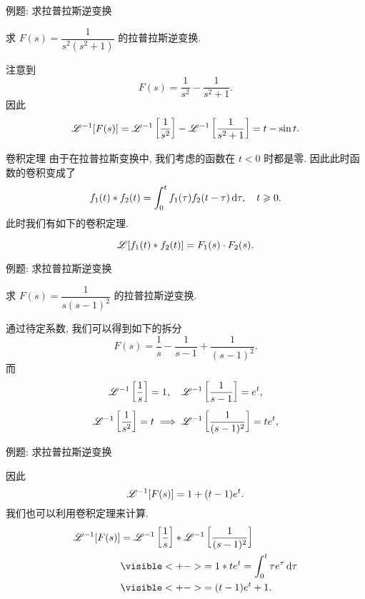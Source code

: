 \begin{frame}{例题: 求拉普拉斯逆变换}
\begin{example}
求 $F(s)=\dfrac1{s^2(s^2+1)}$ 的拉普拉斯逆变换.
\end{example}
\begin{solution}
注意到
\[F(s)=\frac1{s^2}-\frac1{s^2+1}.\]
\onslide<+->
因此
\[\mathscr{L}^{-1}[F(s)]=\mathscr{L}^{-1}\left[\frac1{s^2}\right]
-\mathscr{L}^{-1}\left[\frac1{s^2+1}\right]
=t-\sin t.\]
\end{solution}
\end{frame}


\begin{frame}{卷积定理}
\onslide<+->
由于在拉普拉斯变换中, 我们考虑的函数在 $t<0$ 时都是零.
\onslide<+->
因此此时函数的卷积变成了
\[f_1(t)\ast f_2(t)=\int_0^t f_1(\tau)f_2(t-\tau)\,\mathrm{d} \tau,\quad t\geqslant 0.\]
\onslide<+->
此时我们有如下的卷积定理.
\begin{theorem}[卷积定理]
\[\mathscr{L}[f_1(t)\ast f_2(t)]=F_1(s)\cdot F_2(s).\]
\end{theorem}
\end{frame}


\begin{frame}{例题: 求拉普拉斯逆变换}
\beqskip{6pt}
\begin{example}
求 $F(s)=\dfrac1{s(s-1)^2}$ 的拉普拉斯逆变换.
\end{example}
\begin{solution}
通过待定系数, 我们可以得到如下的拆分
\[F(s)=\frac1s-\frac1{s-1}+\frac1{(s-1)^2}.\]
\onslide<+->
而
\[\mathscr{L}^{-1}\left[\frac1s\right]=1,\quad \mathscr{L}^{-1}\left[\frac1{s-1}\right]=e^t,\]
\onslide<+->
\[\mathscr{L}^{-1}\left[\frac1{s^2}\right]=t\implies\mathscr{L}^{-1}\left[\frac1{(s-1)^2}\right]=te^t,\]
\end{solution}
\endgroup
\end{frame}


\begin{frame}{例题: 求拉普拉斯逆变换}
\begin{solutionc}
因此
\[\mathscr{L}^{-1}[F(s)]=1+(t-1)e^t.\]
\onslide<+->
我们也可以利用卷积定理来计算.
\onslide<+->
\begin{align*}
\msl^{-1}[F(s)]&=\msl^{-1}\left[\frac1s\right]\ast\msl^{-1}\left[\frac1{(s-1)^2}\right]\\
&\visible<+->{=1\ast te^t=\int_0^t\tau e^\tau\diff \tau}\\
&\visible<+->{=(t-1)e^t+1.}
\end{align*}
\end{solutionc}
\end{frame}


